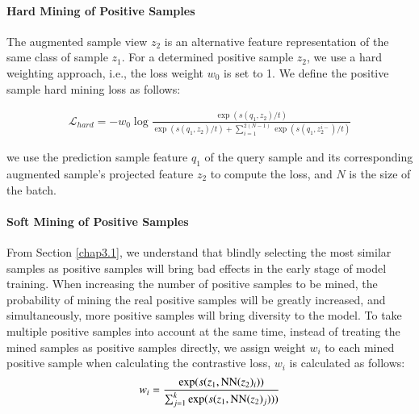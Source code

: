 \documentclass[review]{elsarticle}
\begin{document}
 \paragraph{Hard Mining of Positive Samples} The augmented sample view $z_2$ is an alternative feature representation of the same class of sample $z_1$. For a determined positive sample $z_2$, we use a hard weighting approach, i.e., the loss weight  $w_0$ is set to 1. We define the positive sample hard mining loss as follows:
 
\begin{footnotesize}
\begin{equation}
\begin{aligned}
\mathcal{L} _{hard}= 
 -w_0\log\frac{  \exp(s( q_1,z_2)/t )           }    {\exp(s( q_1,z_2)/t )
     +\sum_{i=1}^{2(N-1)}\exp(s( q_1,z_2^{i-})/t )}   
     \label{equation4}
\end{aligned}
\end{equation}
\end{footnotesize}we use the prediction sample feature $q_1$ of the query sample and its corresponding augmented sample's projected feature $z_2$ to compute the loss, and $N$ is the size of the batch.

 \paragraph{Soft Mining of Positive Samples} 
 From Section \ref{chap3.1},  we understand that blindly selecting the most similar samples as positive samples will bring bad effects in the early stage of model training. When increasing the number of positive samples to be mined, the probability of mining the real positive samples will be greatly increased, and  simultaneously, more positive samples will bring  diversity to the model. To take multiple positive samples into account at the same time, instead of  treating the mined samples as positive samples directly, we assign weight $w_i$ to each mined positive sample when calculating the contrastive loss, $w_i$ is calculated as follows:
\begin{equation}
\begin{aligned}
w_i=\frac{\exp(s(z_1,{\rm NN}(z_2)_i))}{\sum_{j=1}^{k}\exp(s(z_1,{\rm NN}(z_2)_j)))}  
     \label{equation5}
\end{aligned}
\end{equation}
\end{document}
